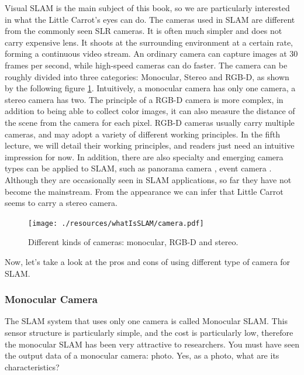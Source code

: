 Visual SLAM is the main subject of this book, so we are particularly interested in what the Little Carrot's eyes can do. The cameras used in SLAM are different from the commonly seen SLR cameras. It is often much simpler and does not carry expensive lens. It shoots at the surrounding environment at a certain rate, forming a continuous video stream. An ordinary camera can capture images at 30 frames per second, while high-speed cameras can do faster. The camera can be roughly divided into three categories: Monocular, Stereo and RGB-D, as shown by the following figure \ref{fig:cameras}. Intuitively, a monocular camera has only one camera, a stereo camera has two. The principle of a RGB-D camera is more complex, in addition to being able to collect color images, it can also measure the distance of the scene from the camera for each pixel. RGB-D cameras usually carry multiple cameras, and may adopt a variety of different working principles. In the fifth lecture, we will detail their working principles, and readers just need an intuitive impression for now. In addition, there are also specialty and emerging camera types can be applied to SLAM, such as panorama camera \cite{Pretto2011}, event camera \cite{Rueckauer2016}. Although they are occasionally seen in SLAM applications, so far they have not become the mainstream. From the appearance we can infer that Little Carrot seems to carry a stereo camera.

\begin{figure}
	\centering
	\texttt{[image: ./resources/whatIsSLAM/camera.pdf]}
	\caption{Different kinds of cameras: monocular, RGB-D and stereo. }
	\label{fig:cameras}
\end{figure}

Now, let's take a look at the pros and cons of using different type of camera for SLAM.

\subsubsection{Monocular Camera}

The SLAM system that uses only one camera is called Monocular SLAM. This sensor structure is particularly simple, and the cost is particularly low, therefore the monocular SLAM has been very attractive to researchers. You must have seen the output data of a monocular camera: photo. Yes, as a photo, what are its characteristics?

